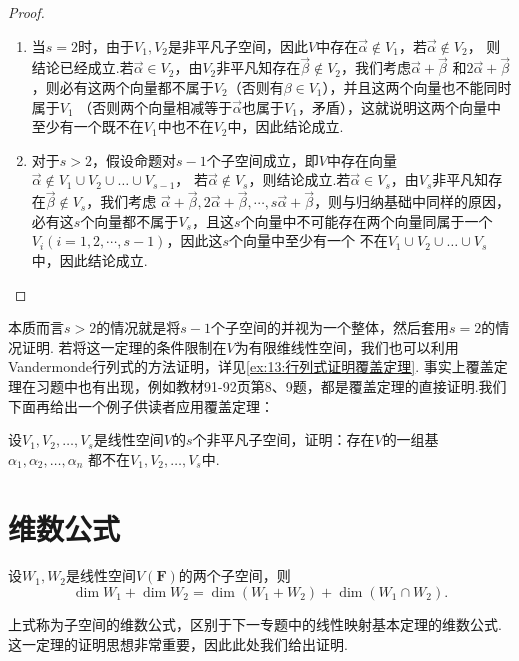 \begin{proof}
    \begin{enumerate}
        \item 当$s=2$时，由于$V_1,V_2$是非平凡子空间，因此$V$中存在$\vec{\alpha}\notin V_1$，若$\vec{\alpha}\notin V_2$，
        则结论已经成立.若$\vec{\alpha}\in V_2$，由$V_2$非平凡知存在$\vec{\beta}\notin V_2$，我们考虑$\vec{\alpha}+\vec{\beta}$
        和$2\vec{\alpha}+\vec{\beta}$，则必有这两个向量都不属于$V_2$（否则有$\beta\in V_1$），并且这两个向量也不能同时属于$V_1$
        （否则两个向量相减等于$\vec{\alpha}$也属于$V_1$，矛盾），这就说明这两个向量中至少有一个既不在$V_1$中也不在$V_2$中，因此结论成立.
        \item 对于$s>2$，假设命题对$s-1$个子空间成立，即$V$中存在向量$\vec{\alpha}\notin V_1\cup V_2\cup\ldots\cup V_{s-1}$，
        若$\vec{\alpha}\notin V_s$，则结论成立.若$\vec{\alpha}\in V_s$，由$V_s$非平凡知存在$\vec{\beta}\notin V_s$，我们考虑
        $\vec{\alpha}+\vec{\beta},2\vec{\alpha}+\vec{\beta},\cdots,s\vec{\alpha}+\vec{\beta}$，则与归纳基础中同样的原因，
        必有这$s$个向量都不属于$V_s$，且这$s$个向量中不可能存在两个向量同属于一个$V_i(i=1,2,\cdots,s-1)$，因此这$s$个向量中至少有一个
        不在$V_1\cup V_2\cup\ldots\cup V_s$中，因此结论成立.
    \end{enumerate}
\end{proof}

本质而言$s>2$的情况就是将$s-1$个子空间的并视为一个整体，然后套用$s=2$的情况证明.
若将这一定理的条件限制在$V$为有限维线性空间，我们也可以利用Vandermonde行列式的方法证明，详见\autoref{ex:13:行列式证明覆盖定理}.
事实上覆盖定理在习题中也有出现，例如教材91-92页第8、9题，都是覆盖定理的直接证明.我们下面再给出一个例子供读者应用覆盖定理：
\begin{example}
    设$V_1,V_2,\ldots,V_s$是线性空间$V$的$s$个非平凡子空间，证明：存在$V$的一组基$\alpha_1,\alpha_2,\ldots,\alpha_n$
    都不在$V_1,V_2,\ldots,V_s$中.
\end{example}

\section{维数公式}
\begin{theorem}\label{thm:4:维数公式}
    设$W_1,W_2$是线性空间$V(\mathbf{F})$的两个子空间，则
    \[\dim W_1+\dim W_2=\dim(W_1+W_2)+\dim(W_1\cap W_2).\]
\end{theorem}
上式称为子空间的维数公式，区别于下一专题中的线性映射基本定理的维数公式.这一定理的证明思想非常重要，因此此处我们给出证明.

